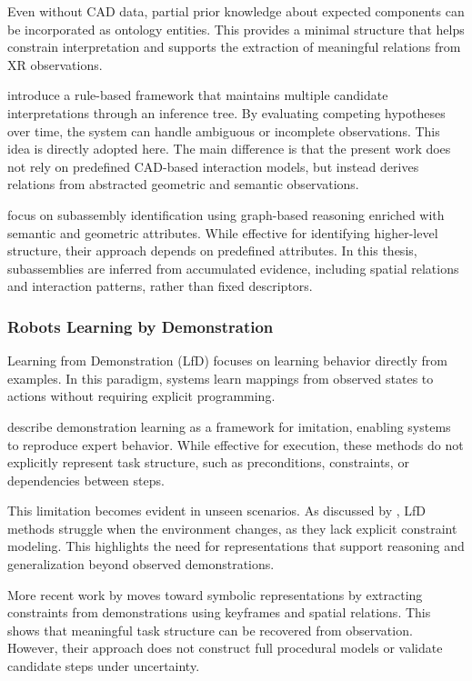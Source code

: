 \documentclass[11pt,titlepage,openright]{book}
\begin{document}
Even without CAD data, partial prior knowledge about expected components can be incorporated as ontology entities. This provides a minimal structure that helps constrain interpretation and supports the extraction of meaningful relations from XR observations.

\citet{WangEtAl2018} introduce a rule-based framework that maintains multiple candidate interpretations through an inference tree. By evaluating competing hypotheses over time, the system can handle ambiguous or incomplete observations. This idea is directly adopted here. The main difference is that the present work does not rely on predefined CAD-based interaction models, but instead derives relations from abstracted geometric and semantic observations.

\citet{Shi2020} focus on subassembly identification using graph-based reasoning enriched with semantic and geometric attributes. While effective for identifying higher-level structure, their approach depends on predefined attributes. In this thesis, subassemblies are inferred from accumulated evidence, including spatial relations and interaction patterns, rather than fixed descriptors.



\subsubsection{Robots Learning by Demonstration}
\label{sec:learning-by-demonstration}

Learning from Demonstration (LfD) focuses on learning behavior directly from examples. In this paradigm, systems learn mappings from observed states to actions without requiring explicit programming.

\citet{Correia_2024} describe demonstration learning as a framework for imitation, enabling systems to reproduce expert behavior. While effective for execution, these methods do not explicitly represent task structure, such as preconditions, constraints, or dependencies between steps.

This limitation becomes evident in unseen scenarios. As discussed by \citet{Ye_2017}, LfD methods struggle when the environment changes, as they lack explicit constraint modeling. This highlights the need for representations that support reasoning and generalization beyond observed demonstrations.

More recent work by \citet{Sen_2024} moves toward symbolic representations by extracting constraints from demonstrations using keyframes and spatial relations. This shows that meaningful task structure can be recovered from observation. However, their approach does not construct full procedural models or validate candidate steps under uncertainty.
\end{document}
